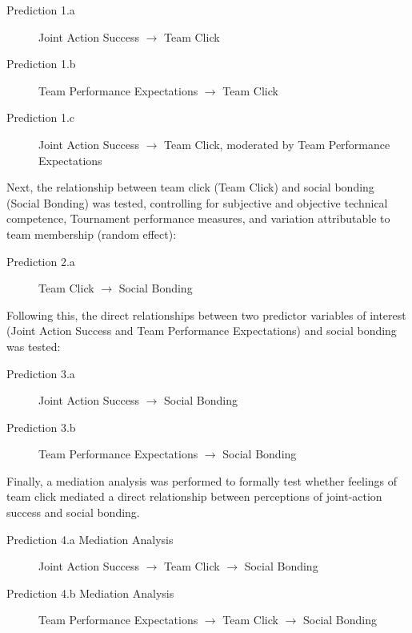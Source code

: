 {\begin{description}
  \item [Prediction 1.a] Joint Action Success  $\rightarrow$ Team Click
  \item [Prediction 1.b] Team Performance Expectations $\rightarrow$ Team Click
  \item [Prediction 1.c] Joint Action Success $\rightarrow$ Team Click, moderated by Team Performance Expectations
\end{description}

Next, the relationship between team click (Team Click) and social bonding (Social Bonding) was tested, controlling for subjective and objective technical competence, Tournament performance measures, and variation attributable to team membership (random effect):

\begin{description}
  \item [Prediction 2.a] Team Click $\rightarrow$ Social Bonding
\end{description}

Following this, the direct relationships between two predictor variables of interest (Joint Action Success and Team Performance Expectations) and social bonding was tested:

\begin{description}
  \item [Prediction 3.a] Joint Action Success $\rightarrow$ Social Bonding
  \item [Prediction 3.b] Team Performance Expectations $\rightarrow$ Social Bonding
\end{description}

Finally, a mediation analysis was performed to formally test whether feelings of team click mediated a direct relationship between perceptions of joint-action success and social bonding.

\begin{description}
\item[Prediction 4.a Mediation Analysis] Joint Action Success $\rightarrow$ Team Click $\rightarrow$ Social Bonding
\item[Prediction 4.b Mediation Analysis] Team Performance Expectations $\rightarrow$ Team Click $\rightarrow$ Social Bonding
\end{description}


















}
